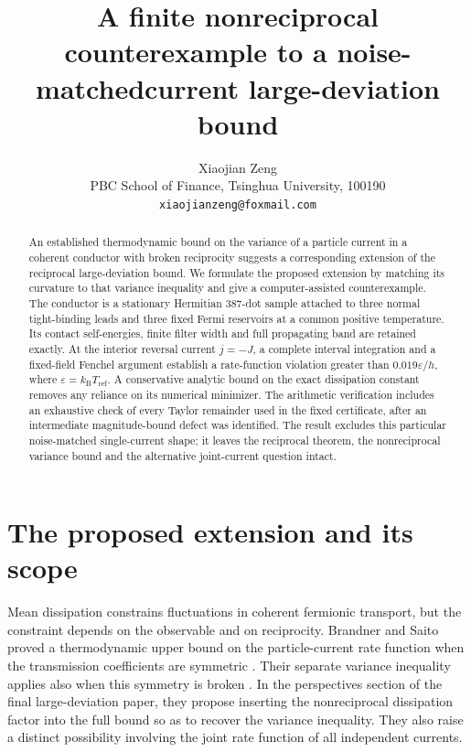\documentclass[11pt,a4paper]{article}
\title{A finite nonreciprocal counterexample to a noise-matched\newline current large-deviation bound}
\author{Xiaojian Zeng\\[3pt]
\small PBC School of Finance, Tsinghua University, 100190\\
\small\texttt{xiaojianzeng@foxmail.com}}
\date{}
\newcommand{\kb}{k_{\mathrm B}}
\newcommand{\ee}{\varepsilon}
\begin{document}
\maketitle
\begin{abstract}
An established thermodynamic bound on the variance of a particle current in a
coherent conductor with broken reciprocity suggests a corresponding extension
of the reciprocal large-deviation bound. We formulate the proposed extension
by matching its curvature to that variance inequality and give a
computer-assisted counterexample. The conductor is a stationary Hermitian
387-dot sample attached to three normal tight-binding leads and three fixed
Fermi reservoirs at a common positive temperature. Its contact self-energies,
finite filter width and full propagating band are retained exactly. At the
interior reversal current $j=-J$, a complete interval integration and a
fixed-field Fenchel argument establish a rate-function violation greater than
$0.019\ee/h$, where $\ee=\kb T_{\mathrm{ref}}$. A conservative analytic bound
on the exact dissipation constant removes any reliance on its numerical
minimizer. The arithmetic verification includes an exhaustive check of every
Taylor remainder used in the fixed certificate, after an intermediate
magnitude-bound defect was identified. The result excludes this particular
noise-matched single-current shape; it leaves the reciprocal theorem, the
nonreciprocal variance bound and the alternative joint-current question intact.
\end{abstract}

\section{The proposed extension and its scope}

Mean dissipation constrains fluctuations in coherent fermionic transport, but
the constraint depends on the observable and on reciprocity. Brandner and
Saito proved a thermodynamic upper bound on the particle-current rate function
when the transmission coefficients are symmetric
\cite{BrandnerSaitoJPA2025}. Their separate variance inequality applies also
when this symmetry is broken \cite{BrandnerSaitoPRL2025}. In the perspectives
section of the final large-deviation paper, they propose inserting the
nonreciprocal dissipation factor into the full bound so as to recover the
variance inequality. They also raise a distinct possibility involving the
joint rate function of all independent currents.
\end{document}
